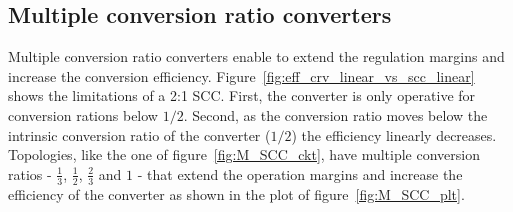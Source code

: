 \subsection{Multiple conversion ratio converters}

Multiple conversion ratio converters enable to extend the regulation margins and increase the conversion efficiency. Figure~\ref{fig:eff_crv_linear_vs_scc_linear} shows the limitations of a 2:1 SCC. First, the converter is only operative for conversion rations below $1/2$. Second, as the conversion ratio moves below the intrinsic conversion  ratio of the converter ($1/2$) the efficiency linearly decreases.
Topologies, like the one of figure~\ref{fig:M_SCC_ckt}, have multiple conversion ratios - $\frac{1}{3}$, $\frac{1}{2}$, $\frac{2}{3}$ and $1$ - that extend the operation margins and increase the efficiency of the converter as shown in the plot of figure~\ref{fig:M_SCC_plt}.

